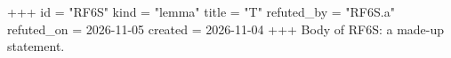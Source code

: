 +++
id = "RF6S"
kind = "lemma"
title = "T"
refuted_by = "RF6S.a"
refuted_on = 2026-11-05
created = 2026-11-04
+++
Body of RF6S: a made-up statement.
